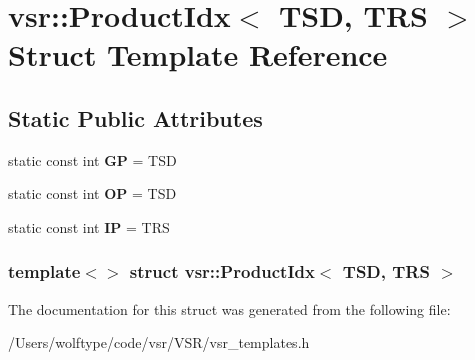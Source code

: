 \hypertarget{structvsr_1_1_product_idx_3_01_t_s_d_00_01_t_r_s_01_4}{\section{vsr\-:\-:Product\-Idx$<$ T\-S\-D, T\-R\-S $>$ Struct Template Reference}
\label{structvsr_1_1_product_idx_3_01_t_s_d_00_01_t_r_s_01_4}
}
\subsection*{Static Public Attributes}
\begin{DoxyCompactItemize}
\item 
\hypertarget{structvsr_1_1_product_idx_3_01_t_s_d_00_01_t_r_s_01_4_a8bf2250ec5068974450668d5023ab34f}{static const int {\bfseries G\-P} = T\-S\-D}\label{structvsr_1_1_product_idx_3_01_t_s_d_00_01_t_r_s_01_4_a8bf2250ec5068974450668d5023ab34f}

\item 
\hypertarget{structvsr_1_1_product_idx_3_01_t_s_d_00_01_t_r_s_01_4_a15b58e95e927d6cb6a88af653255fb06}{static const int {\bfseries O\-P} = T\-S\-D}\label{structvsr_1_1_product_idx_3_01_t_s_d_00_01_t_r_s_01_4_a15b58e95e927d6cb6a88af653255fb06}

\item 
\hypertarget{structvsr_1_1_product_idx_3_01_t_s_d_00_01_t_r_s_01_4_aadfb7d8e66573c183e182748baaa7cba}{static const int {\bfseries I\-P} = T\-R\-S}\label{structvsr_1_1_product_idx_3_01_t_s_d_00_01_t_r_s_01_4_aadfb7d8e66573c183e182748baaa7cba}

\end{DoxyCompactItemize}
\subsubsection*{template$<$$>$ struct vsr\-::\-Product\-Idx$<$ T\-S\-D, T\-R\-S $>$}



The documentation for this struct was generated from the following file\-:\begin{DoxyCompactItemize}
\item 
/\-Users/wolftype/code/vsr/\-V\-S\-R/vsr\-\_\-templates.\-h\end{DoxyCompactItemize}
